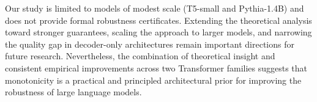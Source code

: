 \documentclass{article}
\theoremstyle{plain}
\theoremstyle{definition}
\theoremstyle{remark}
\theoremstyle{plain}
\begin{document}
Our study is limited to models of modest scale (T5-small and Pythia-1.4B) and does not provide formal robustness certificates. Extending the theoretical analysis toward stronger guarantees, scaling the approach to larger models, and narrowing the quality gap in decoder-only architectures remain important directions for future research. Nevertheless, the combination of theoretical insight and consistent empirical improvements across two Transformer families suggests that monotonicity is a practical and principled architectural prior for improving the robustness of large language models.
\end{document}
